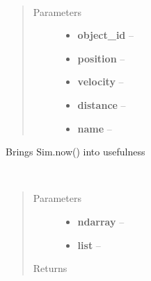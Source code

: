 \documentclass[letterpaper,10pt,english]{sphinxmanual}
\begin{document}
\begin{fulllineitems}
\label{index:aietes.Tools.MemoryEntry}~\begin{quote}\begin{description}
\item[{Parameters}] \leavevmode\begin{itemize}
\item {} 
\textbf{object\_id} -- 

\item {} 
\textbf{position} -- 

\item {} 
\textbf{velocity} -- 

\item {} 
\textbf{distance} -- 

\item {} 
\textbf{name} -- 

\end{itemize}

\end{description}\end{quote}

\end{fulllineitems}


\begin{fulllineitems}
\label{index:aietes.Tools.SimTimeFilter}
Brings Sim.now() into usefulness

\end{fulllineitems}


\begin{fulllineitems}
\label{index:aietes.Tools.add_ndarray_to_set}~\begin{quote}\begin{description}
\item[{Parameters}] \leavevmode\begin{itemize}
\item {} 
\textbf{ndarray} -- 

\item {} 
\textbf{list} -- 

\end{itemize}

\item[{Returns}] \leavevmode


\end{description}\end{quote}

\end{fulllineitems}
\end{document}
